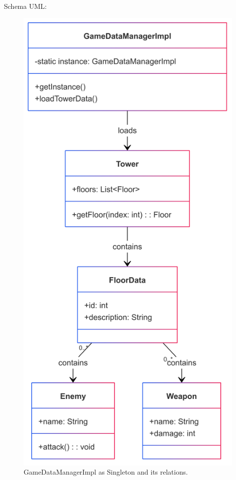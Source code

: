 \documentclass[a4paper,12pt]{report}
\begin{document}
Schema UML:
\begin{figure}[H]
	\centering
	\includegraphics[scale=0.08]{img/GameDataManagerUML.png}
	\caption{GameDataManagerImpl as Singleton and its relations.}
\end{figure}
\end{document}
